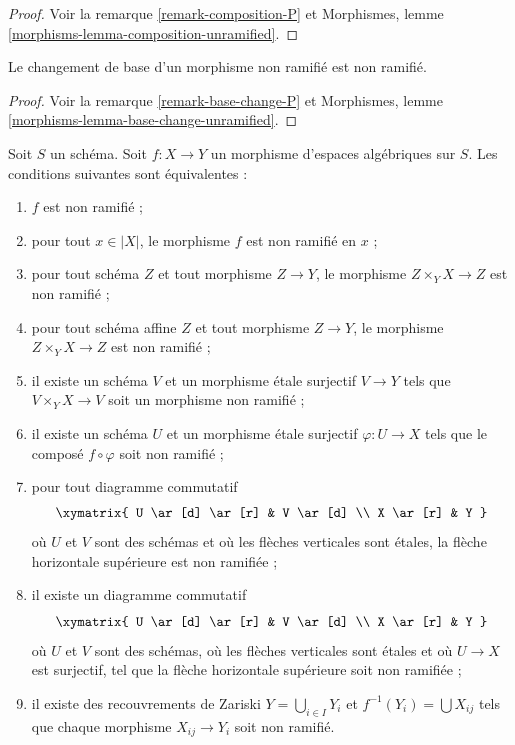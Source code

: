 \begin{proof}
Voir la remarque \ref{remark-composition-P} et
Morphismes, lemme \ref{morphisms-lemma-composition-unramified}.
\end{proof}

\begin{lemma}
\label{lemma-base-change-unramified}
Le changement de base d'un morphisme non ramifié est non ramifié.
\end{lemma}

\begin{proof}
Voir la remarque \ref{remark-base-change-P} et
Morphismes, lemme \ref{morphisms-lemma-base-change-unramified}.
\end{proof}

\begin{lemma}
\label{lemma-unramified-local}
Soit $S$ un schéma.
Soit $f : X \to Y$ un morphisme d'espaces algébriques sur $S$.
Les conditions suivantes sont équivalentes :
\begin{enumerate}
\item $f$ est non ramifié ;
\item pour tout $x \in |X|$, le morphisme $f$ est non ramifié en $x$ ;
\item pour tout schéma $Z$ et tout morphisme $Z \to Y$, le morphisme
$Z \times_Y X \to Z$ est non ramifié ;
\item pour tout schéma affine $Z$ et tout morphisme
$Z \to Y$, le morphisme $Z \times_Y X \to Z$ est non ramifié ;
\item il existe un schéma $V$ et un morphisme étale surjectif
$V \to Y$ tels que $V \times_Y X \to V$ soit un morphisme non ramifié ;
\item il existe un schéma $U$ et un morphisme étale surjectif
$\varphi : U \to X$ tels que le composé $f \circ \varphi$
soit non ramifié ;
\item pour tout diagramme commutatif
$$
\xymatrix{
U \ar[d] \ar[r] & V \ar[d] \\
X \ar[r] & Y
}
$$
où $U$ et $V$ sont des schémas et où les flèches verticales sont étales,
la flèche horizontale supérieure est non ramifiée ;
\item il existe un diagramme commutatif
$$
\xymatrix{
U \ar[d] \ar[r] & V \ar[d] \\
X \ar[r] & Y
}
$$
où $U$ et $V$ sont des schémas, où les flèches verticales sont étales et où
$U \to X$ est surjectif, tel que la flèche horizontale supérieure soit non ramifiée ;
\item il existe des recouvrements de Zariski $Y = \bigcup_{i \in I} Y_i$
et $f^{-1}(Y_i) = \bigcup X_{ij}$ tels que
chaque morphisme $X_{ij} \to Y_i$ soit non ramifié.
\end{enumerate}
\end{lemma}

